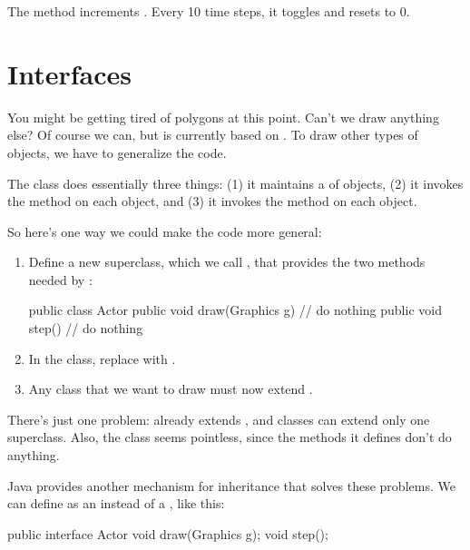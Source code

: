 The  method increments .
Every 10 time steps, it toggles  and resets  to 0.


\section{Interfaces}

You might be getting tired of polygons at this point.
Can't we draw anything else?
Of course we can, but  is currently based on .
To draw other types of objects, we have to generalize the code.

The  class does essentially three things: (1) it maintains a  of objects, (2) it invokes the  method on each object, and (3) it invokes the  method on each object.

So here's one way we could make the code more general:

\begin{enumerate}

\item Define a new superclass, which we call , that provides the two methods needed by :

\begin{code}
public class Actor {
    public void draw(Graphics g) {
        // do nothing
    }
    public void step() {
        // do nothing
    }
}
\end{code}

\item In the  class, replace  with .

\item Any class that we want to draw must now extend .

\end{enumerate}

There's just one problem:  already extends , and classes can extend only one superclass.
Also, the  class seems pointless, since the methods it defines don't do anything.


Java provides another mechanism for inheritance that solves these problems.
We can define  as an  instead of a , like this:

\begin{code}
public interface Actor {
    void draw(Graphics g);
    void step();
}
\end{code}


